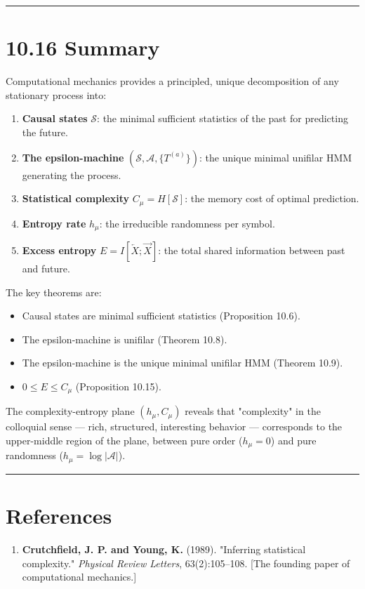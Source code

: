 \bigskip\hrule\bigskip

\section{10.16 Summary}

Computational mechanics provides a principled, unique decomposition of any stationary process into:

\begin{enumerate}
  \item \textbf{Causal states} $\mathcal{S}$: the minimal sufficient statistics of the past for predicting the future.
  \item \textbf{The epsilon-machine} $(\mathcal{S}, \mathcal{A}, \{ T^{(a)}\} )$: the unique minimal unifilar HMM generating the process.
  \item \textbf{Statistical complexity} $C_\mu = H[\mathcal{S}]$: the memory cost of optimal prediction.
  \item \textbf{Entropy rate} $h_\mu$: the irreducible randomness per symbol.
  \item \textbf{Excess entropy} $E = I[\overleftarrow{X}; \overrightarrow{X}]$: the total shared information between past and future.
\end{enumerate}

The key theorems are:
\begin{itemize}
  \item Causal states are minimal sufficient statistics (Proposition 10.6).
  \item The epsilon-machine is unifilar (Theorem 10.8).
  \item The epsilon-machine is the unique minimal unifilar HMM (Theorem 10.9).
  \item $0 \leq E \leq C_\mu$ (Proposition 10.15).
\end{itemize}

The complexity-entropy plane $(h_\mu, C_\mu)$ reveals that "complexity" in the colloquial sense --- rich, structured, interesting behavior --- corresponds to the upper-middle region of the plane, between pure order ($h_\mu = 0$) and pure randomness ($h_\mu = \log|\mathcal{A}|$).

\bigskip\hrule\bigskip

\section{References}

\begin{enumerate}
  \item \textbf{Crutchfield, J. P. and Young, K.} (1989). "Inferring statistical complexity." \textit{Physical Review Letters}, 63(2):105--108. [The founding paper of computational mechanics.]
\end{enumerate}

